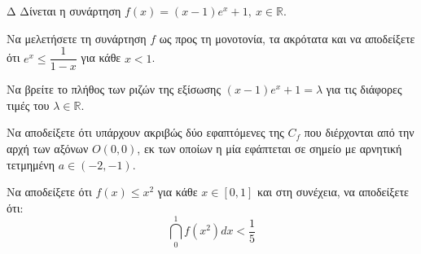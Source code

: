 \begin{thema}{Δ}
Δίνεται η συνάρτηση $f(x) = (x-1)e^x + 1, \ x \in \mathbb{R}$.
\begin{erwthma}
    \item Να μελετήσετε τη συνάρτηση $f$ ως προς τη μονοτονία, τα ακρότατα και να αποδείξετε ότι $e^x \le \dfrac{1}{1-x}$ για κάθε $x < 1$.
    \item Να βρείτε το πλήθος των ριζών της εξίσωσης $(x-1)e^x + 1 = \lambda$ για τις διάφορες τιμές του $\lambda \in \mathbb{R}$.
    \item Να αποδείξετε ότι υπάρχουν ακριβώς δύο εφαπτόμενες της $C_f$ που διέρχονται από την αρχή των αξόνων $O(0,0)$, εκ των οποίων η μία εφάπτεται σε σημείο με αρνητική τετμημένη $a \in (-2, -1)$.
    \item Να αποδείξετε ότι $f(x) \le x^2$ για κάθε $x \in [0, 1]$ και στη συνέχεια, να αποδείξετε ότι:
    \[ \dint_0^1 f(x^2) dx < \frac{1}{5} \]
\end{erwthma}
\end{thema}
